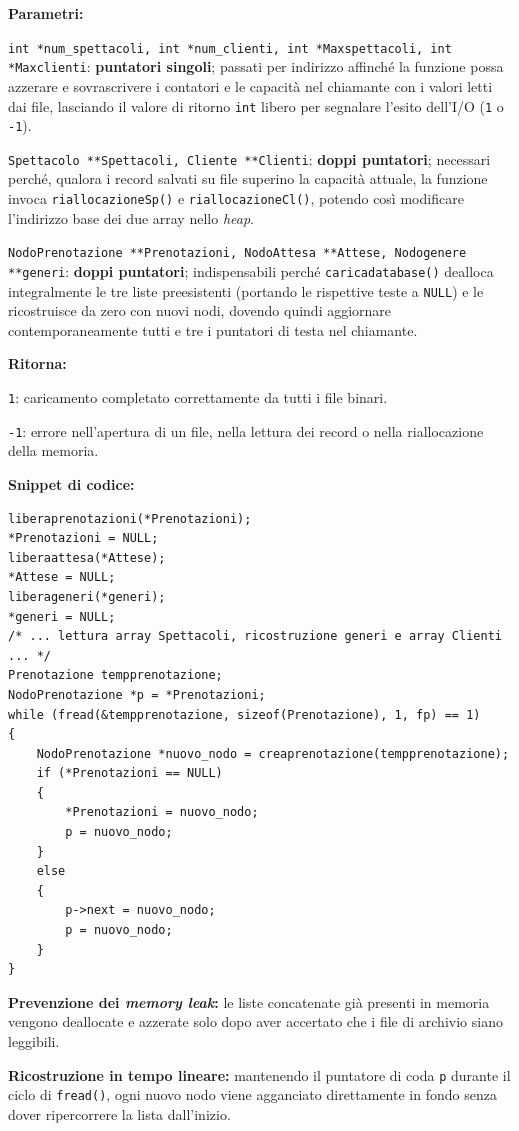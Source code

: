 \documentclass[11pt,a4paper,oneside,openany]{book}
\newenvironment{listacomp}{%
    \small
    \begin{list}{\textendash}{%
        \setlength{\topsep}{2pt}%
        \setlength{\partopsep}{0pt}%
        \setlength{\itemsep}{1pt}%
        \setlength{\parsep}{0pt}%
        \setlength{\leftmargin}{1.2em}%
    }%
}{%
    \end{list}%
}
\begin{document}
\noindent\textbf{Parametri:}
\begin{listacomp}
    \item \texttt{int *num\_spettacoli, int *num\_clienti, int *Maxspettacoli, int *Maxclienti}: \textbf{puntatori singoli}; passati per indirizzo affinché la funzione possa azzerare e sovrascrivere i contatori e le capacità nel chiamante con i valori letti dai file, lasciando il valore di ritorno \texttt{int} libero per segnalare l'esito dell'I/O (\texttt{1} o \texttt{-1}).
    \item \texttt{Spettacolo **Spettacoli, Cliente **Clienti}: \textbf{doppi puntatori}; necessari perché, qualora i record salvati su file superino la capacità attuale, la funzione invoca \texttt{riallocazioneSp()} e \texttt{riallocazioneCl()}, potendo così modificare l'indirizzo base dei due array nello \emph{heap}.
    \item \texttt{NodoPrenotazione **Prenotazioni, NodoAttesa **Attese, Nodogenere **generi}: \textbf{doppi puntatori}; indispensabili perché \texttt{caricadatabase()} dealloca integralmente le tre liste preesistenti (portando le rispettive teste a \texttt{NULL}) e le ricostruisce da zero con nuovi nodi, dovendo quindi aggiornare contemporaneamente tutti e tre i puntatori di testa nel chiamante.
\end{listacomp}

\noindent\textbf{Ritorna:}
\begin{listacomp}
    \item \texttt{1}: caricamento completato correttamente da tutti i file binari.
    \item \texttt{-1}: errore nell'apertura di un file, nella lettura dei record o nella riallocazione della memoria.
\end{listacomp}

\noindent\textbf{Snippet di codice:}
\begin{lstlisting}[caption={Pulizia sicura e ricostruzione della lista prenotazioni in caricadatabase()}]
liberaprenotazioni(*Prenotazioni);
*Prenotazioni = NULL;
liberaattesa(*Attese);
*Attese = NULL;
liberageneri(*generi);
*generi = NULL;
/* ... lettura array Spettacoli, ricostruzione generi e array Clienti ... */
Prenotazione tempprenotazione;
NodoPrenotazione *p = *Prenotazioni;
while (fread(&tempprenotazione, sizeof(Prenotazione), 1, fp) == 1)
{
    NodoPrenotazione *nuovo_nodo = creaprenotazione(tempprenotazione);
    if (*Prenotazioni == NULL)
    {
        *Prenotazioni = nuovo_nodo;
        p = nuovo_nodo;
    }
    else
    {
        p->next = nuovo_nodo;
        p = nuovo_nodo;
    }
}
\end{lstlisting}

\begin{listacomp}
    \item \textbf{Prevenzione dei \emph{memory leak}:} le liste concatenate già presenti in memoria vengono deallocate e azzerate solo dopo aver accertato che i file di archivio siano leggibili.
    \item \textbf{Ricostruzione in tempo lineare:} mantenendo il puntatore di coda \texttt{p} durante il ciclo di \texttt{fread()}, ogni nuovo nodo viene agganciato direttamente in fondo senza dover ripercorrere la lista dall'inizio.
\end{listacomp}
\end{document}
